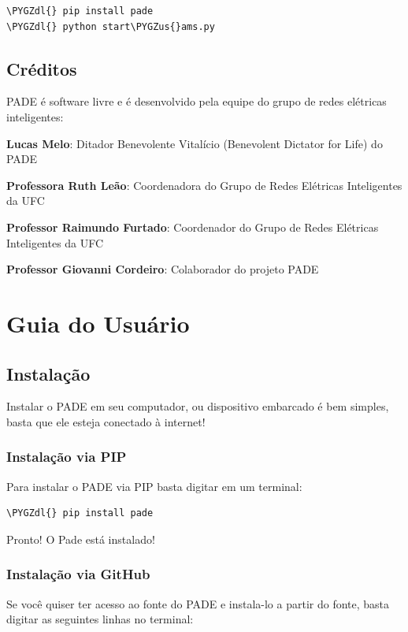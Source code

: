 \documentclass[letterpaper,10pt,brazil]{sphinxmanual}
\def\PYGZus{\char`\_}
\def\PYGZdl{\char`\$}
\begin{document}
\begin{Verbatim}[commandchars=\\\{\}]
\PYGZdl{} pip install pade
\PYGZdl{} python start\PYGZus{}ams.py
\end{Verbatim}


\section{Créditos}
\label{index:creditos}
PADE é software livre e é desenvolvido pela equipe do grupo de redes elétricas inteligentes:

\textbf{Lucas Melo}: Ditador Benevolente Vitalício (Benevolent Dictator for Life) do PADE

\textbf{Professora Ruth Leão}: Coordenadora do Grupo de Redes Elétricas Inteligentes da UFC

\textbf{Professor Raimundo Furtado}: Coordenador do Grupo de Redes Elétricas Inteligentes da UFC

\textbf{Professor Giovanni Cordeiro}: Colaborador do projeto PADE


\chapter{Guia do Usuário}
\label{index:guia-do-usuario}

\section{Instalação}
\label{user/instalacao:instalacao}\label{user/instalacao::doc}
Instalar o PADE em seu computador, ou dispositivo embarcado é bem simples, basta que ele esteja conectado à internet!


\subsection{Instalação via PIP}
\label{user/instalacao:instalacao-via-pip}
Para instalar o PADE via PIP basta digitar em um terminal:

\begin{Verbatim}[commandchars=\\\{\}]
\PYGZdl{} pip install pade
\end{Verbatim}

Pronto! O Pade está instalado!


\subsection{Instalação via GitHub}
\label{user/instalacao:instalacao-via-github}
Se você quiser ter acesso ao fonte do PADE e instala-lo a partir do fonte, basta digitar as seguintes linhas no terminal:
\end{document}
